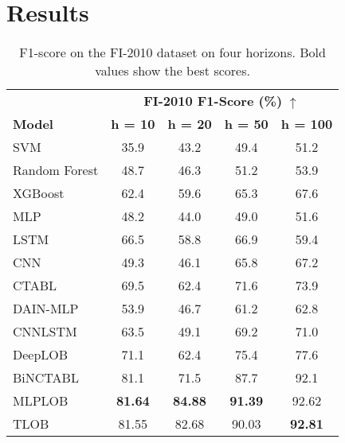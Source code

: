 \section{Results}
\begin{table}[h!]
\centering
\begin{minipage}{0.48\textwidth}
\caption{F1-score on the FI-2010 dataset on four horizons. 
Bold values show the best scores.} 
\label{tab:f1-2010}
\centering
        \begin{tabular}{l|cccc}
            \toprule
            & \multicolumn{4}{c}{\textbf{FI-2010 F1-Score (\%) }$\uparrow$} \\
            \cmidrule(lr){2-5} 
            \textbf{Model} & \textbf{h = 10} & \textbf{h = 20} & \textbf{h = 50} & \textbf{h = 100} \\
            \midrule
            SVM & 35.9 & 43.2 & 49.4 & 51.2 \\
            Random Forest & 48.7 & 46.3 & 51.2 & 53.9 \\
            XGBoost & 62.4 & 59.6 & 65.3 & 67.6 \\
            MLP & 48.2 & 44.0 & 49.0 & 51.6 \\
            LSTM \cite{tsantekidis2017using} & 66.5 & 58.8 & 66.9 & 59.4  \\
            CNN \cite{tsantekidis2017forecasting} & 49.3 & 46.1 & 65.8 & 67.2 \\
            CTABL \cite{tran2018temporal} & 69.5 & 62.4 &  71.6 & 73.9 \\
            DAIN-MLP \cite{passalis2019deep} & 53.9 & 46.7 & 61.2 & 62.8 \\
            CNNLSTM \cite{tsantekidis2020using} & 63.5 & 49.1 & 69.2 & 71.0 \\
            DeepLOB \cite{zhang2019deeplob} & 71.1 & 62.4 & 75.4 & 77.6 \\
            BiNCTABL \cite{tran2021data} & 81.1 & 71.5 & 87.7 & 92.1 \\
            \midrule
            MLPLOB & \textbf{81.64} & \textbf{84.88} & \textbf{91.39} & 92.62 \\
            TLOB & 81.55 & 82.68 & 90.03 & \textbf{92.81} \\
            \bottomrule
        \end{tabular}
        \end{minipage}
\end{table}
